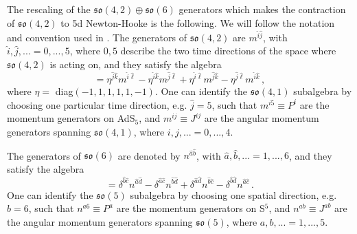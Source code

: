 \documentclass[12pt]{article}
\numberwithin{equation}{section}
\begin{document}
\begin{appendices}
The rescaling of the $\mathfrak{so}(4,2)\oplus\mathfrak{so}(6)$ generators which makes the contraction of $\mathfrak{so}(4,2)$ to 5d Newton-Hooke is the following. We will follow the notation and convention used in \cite{Arutyunov:2009ga}. 
The generators of $\mathfrak{so}(4,2)$ are $m^{\hat{i}\hat{j}}$, with $\hat{i}, \hat{j}, ... = 0, ...,5$, where $0, 5$ describe the two time directions of the space where $\mathfrak{so}(4,2)$ is acting on, and they satisfy the algebra
\begin{equation}
[m^{\hat{i} \hat{j}} , m^{\hat{k}\hat{\ell}}] = \eta^{\hat{j}\hat{k}} m^{\hat{i}\hat{\ell}} - \eta^{\hat{i}\hat{k}}m^{\hat{j}\hat{\ell}} + \eta^{\hat{i}\hat{\ell}}m^{\hat{j}\hat{k}} - \eta^{\hat{j}\hat{\ell}} m^{\hat{i}\hat{k}} \, , 
\end{equation}
where $\eta =$ diag$(-1, 1, 1, 1, 1, -1)$.
One can identify the $\mathfrak{so}(4,1)$ subalgebra by choosing one particular time direction, e.g. $\hat{j}=5$, such that $m^{i5} \equiv P^i$ are the momentum generators on AdS$_5$, and $m^{ij} \equiv J^{ij}$ are the angular momentum generators spanning $\mathfrak{so}(4,1)$, where $i, j, ... = 0, ..., 4$. 

The generators of $\mathfrak{so}(6)$ are denoted by $n^{\hat{a}\hat{b}}$, with $\hat{a}, \hat{b}, ... = 1, ... , 6$, and they satisfy the algebra
\begin{equation}
[n^{\hat{a} \hat{b}} , n^{\hat{c}\hat{d}}] = \delta^{\hat{b}\hat{c}} n^{\hat{a}\hat{d}} - \delta^{\hat{a}\hat{c}}n^{\hat{b}\hat{d}} + \delta^{\hat{a}\hat{d}}n^{\hat{b}\hat{c}} - \delta^{\hat{b}\hat{d}} n^{\hat{a}\hat{c}}   \, .
\end{equation}
One can identify the $\mathfrak{so}(5)$ subalgebra by choosing one spatial direction, e.g. $\hat{b} = 6$, such that $n^{a 6} \equiv P^a$ are the momentum generators on S$^5$, and $n^{ab} \equiv J^{ab}$ are the angular momentum generators spanning $\mathfrak{so}(5)$, where $a, b, ... = 1, ..., 5$. 


\end{appendices}
\end{document}
